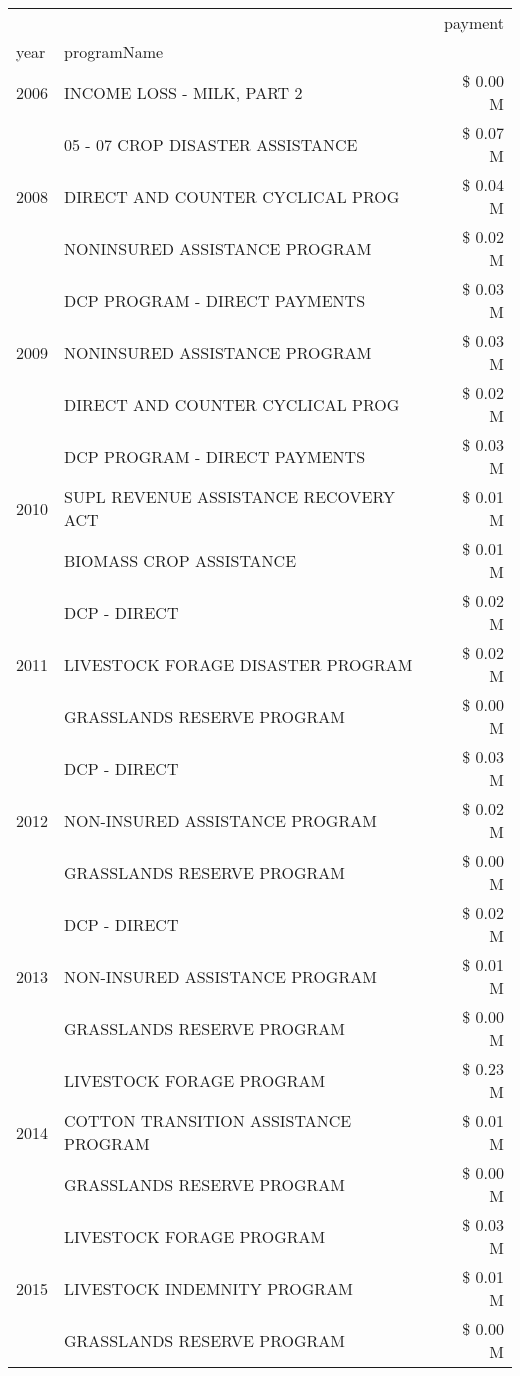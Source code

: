 \begin{tabular}{llr}
\toprule
 &  & payment \\
year & programName &  \\
\midrule
2006 & INCOME LOSS - MILK, PART 2 & \$ 0.00 M \\
\cline{1-3}
\multirow[t]{3}{*}{2008} & 05 - 07 CROP DISASTER ASSISTANCE & \$ 0.07 M \\
 & DIRECT AND COUNTER CYCLICAL PROG & \$ 0.04 M \\
 & NONINSURED ASSISTANCE PROGRAM & \$ 0.02 M \\
\cline{1-3}
\multirow[t]{3}{*}{2009} & DCP PROGRAM - DIRECT PAYMENTS & \$ 0.03 M \\
 & NONINSURED ASSISTANCE PROGRAM & \$ 0.03 M \\
 & DIRECT AND COUNTER CYCLICAL PROG & \$ 0.02 M \\
\cline{1-3}
\multirow[t]{3}{*}{2010} & DCP PROGRAM - DIRECT PAYMENTS & \$ 0.03 M \\
 & SUPL REVENUE ASSISTANCE RECOVERY ACT & \$ 0.01 M \\
 & BIOMASS CROP ASSISTANCE & \$ 0.01 M \\
\cline{1-3}
\multirow[t]{3}{*}{2011} & DCP - DIRECT & \$ 0.02 M \\
 & LIVESTOCK FORAGE DISASTER PROGRAM & \$ 0.02 M \\
 & GRASSLANDS RESERVE PROGRAM & \$ 0.00 M \\
\cline{1-3}
\multirow[t]{3}{*}{2012} & DCP - DIRECT & \$ 0.03 M \\
 & NON-INSURED ASSISTANCE PROGRAM & \$ 0.02 M \\
 & GRASSLANDS RESERVE PROGRAM & \$ 0.00 M \\
\cline{1-3}
\multirow[t]{3}{*}{2013} & DCP - DIRECT & \$ 0.02 M \\
 & NON-INSURED ASSISTANCE PROGRAM & \$ 0.01 M \\
 & GRASSLANDS RESERVE PROGRAM & \$ 0.00 M \\
\cline{1-3}
\multirow[t]{3}{*}{2014} & LIVESTOCK FORAGE PROGRAM & \$ 0.23 M \\
 & COTTON TRANSITION ASSISTANCE PROGRAM & \$ 0.01 M \\
 & GRASSLANDS RESERVE PROGRAM & \$ 0.00 M \\
\cline{1-3}
\multirow[t]{3}{*}{2015} & LIVESTOCK FORAGE PROGRAM & \$ 0.03 M \\
 & LIVESTOCK INDEMNITY PROGRAM & \$ 0.01 M \\
 & GRASSLANDS RESERVE PROGRAM & \$ 0.00 M \\

\end{tabular}
